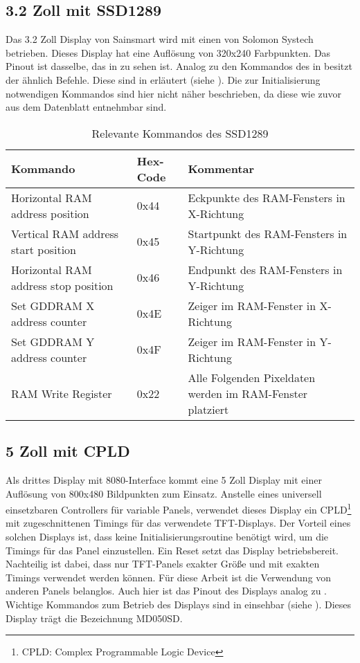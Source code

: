 \subsection{3.2 Zoll mit SSD1289}
Das 3.2 Zoll Display von Sainsmart wird mit einen  von Solomon Systech betrieben. Dieses Display hat eine Auflösung von 320x240 Farbpunkten. Das Pinout ist dasselbe, das in  zu sehen ist. Analog zu den Kommandos des  in  besitzt der  ähnlich Befehle. Diese sind in   erläutert (siehe \cite{SSD2007}). Die zur Initialisierung notwendigen Kommandos sind hier nicht näher beschrieben, da diese wie zuvor aus dem Datenblatt entnehmbar sind.
\begin{table}[h]
\begin{tabular}{|p{4cm}|p{1cm}|p{8cm}|}\hline
\rowcolor{TableBackgroundColor}
   \textbf{Kommando} & \textbf{Hex-Code} & \textbf{Kommentar}\\ \hline
   Horizontal RAM address position & 0x44 & Eckpunkte des RAM-Fensters in X-Richtung \\ \hline
   Vertical RAM address start position & 0x45 & Startpunkt des RAM-Fensters in Y-Richtung \\ \hline
   Horizontal RAM address stop position & 0x46 & Endpunkt des  RAM-Fensters in Y-Richtung \\ \hline
   Set GDDRAM X address counter & 0x4E & Zeiger im  RAM-Fenster in X-Richtung \\ \hline
   Set GDDRAM Y address counter & 0x4F & Zeiger im RAM-Fenster in Y-Richtung \\ \hline
   RAM Write  Register & 0x22 & Alle Folgenden Pixeldaten werden im RAM-Fenster platziert \\ \hline
\end{tabular}
\caption{Relevante Kommandos des SSD1289}
\label{tab:Kommandos_SSD1289}
\end{table}


\subsection{5 Zoll mit CPLD}
Als drittes Display mit 8080-Interface kommt eine 5 Zoll Display mit einer Auflösung von 800x480 Bildpunkten zum Einsatz. Anstelle eines universell einsetzbaren Controllers für variable Panels, verwendet dieses Display ein CPLD\footnote{CPLD: Complex Programmable Logic Device} mit zugeschnittenen Timings für das verwendete TFT-Displays. Der Vorteil eines solchen Displays ist, dass keine Initialisierungsroutine benötigt wird, um die Timings für das Panel einzustellen. Ein Reset setzt das Display betriebsbereit. Nachteilig ist dabei, dass nur TFT-Panels exakter Größe und mit exakten Timings verwendet werden können. Für diese Arbeit ist die Verwendung von anderen Panels belanglos. Auch hier ist das Pinout des Displays analog zu .\newline
Wichtige Kommandos zum Betrieb des Displays sind in  einsehbar (siehe \cite{ITEAD2013}). Dieses Display trägt die Bezeichnung MD050SD.

